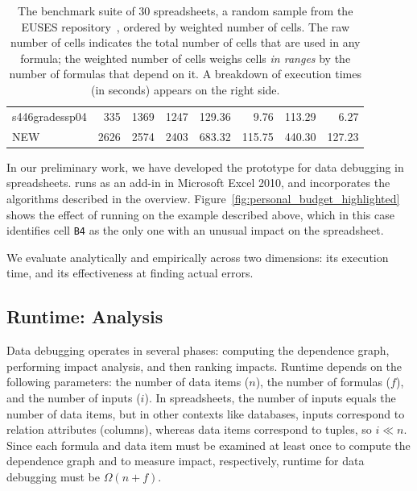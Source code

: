 {\begin{table}[!b]
\begin{tabular}{l|rrr||r|rrr}
\small{s446gradessp04} & \small{335} & \small{1369} & \small{1247} & \small{129.36} & \small{9.76} & \small{113.29} & \small{6.27} \\ 
\small{NEW} & \small{2626} & \small{2574} & \small{2403} & \small{683.32} & \small{115.75} & \small{440.30} & \small{127.23} \\ 
    \end{tabular}%
  \caption{The benchmark suite of 30 spreadsheets, a random sample from the EUSES repository~\cite{Fisher:2005:ESC:1082983.1083242}, ordered by weighted number of cells. The raw number of cells indicates the total number of cells that are used in any formula; the weighted number of cells weighs cells \emph{in ranges} by the number of formulas that depend on it. A breakdown of \checkcell{} execution times (in seconds) appears on the right side.\label{tab:spreadsheet_characteristics}}
\end{table}
}

In our preliminary work, we have developed the \checkcell{} prototype
for data debugging in spreadsheets.  \checkcell{} runs as an add-in in
Microsoft Excel 2010, and incorporates the algorithms described in the
overview. Figure~\ref{fig:personal_budget_highlighted} shows the
effect of running \checkcell{} on the example described above, which
in this case identifies cell \texttt{B4} as the only one with an
unusual impact on the spreadsheet.


We evaluate \checkcell{} analytically and empirically across
two dimensions: its execution time, and its effectiveness at finding
actual errors. 

\subsection{Runtime: Analysis}
\label{sec:asymptotic_analysis}

Data debugging operates in several phases: computing the dependence
graph, performing impact analysis, and then ranking impacts. Runtime
depends on the following parameters: the number of data items ($n$),
the number of formulas ($f$), and the number of inputs ($i$). In
spreadsheets, the number of inputs equals the number of data items,
but in other contexts like databases, inputs correspond to relation attributes (columns), whereas data items correspond to tuples, so
$i \ll n$. Since each formula and data item must be examined at least
once to compute the dependence graph and to measure impact,
respectively, runtime for data debugging must be 
$\Omega(n+f)$.

